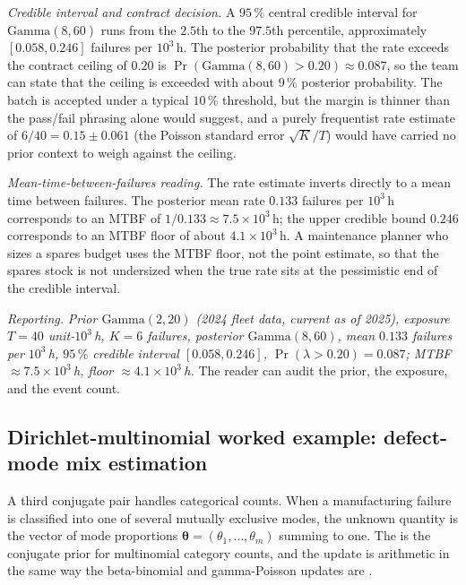 

\textit{Credible interval and contract decision.} A $95 \,\%$
central credible interval for $\text{Gamma}(8, 60)$ runs from the
$2.5$th to the $97.5$th percentile, approximately $[0.058, 0.246]$
failures per $10^{3}\,\si{\hour}$. The posterior probability that
the rate exceeds the contract ceiling of $0.20$ is
$\Pr(\text{Gamma}(8, 60) > 0.20) \approx 0.087$, so the team can
state that the ceiling is exceeded with about $9 \,\%$ posterior
probability. The batch is accepted under a typical $10 \,\%$
threshold, but the margin is thinner than the pass/fail phrasing
alone would suggest, and a purely frequentist rate estimate of
$6/40 = 0.15 \pm 0.061$ (the Poisson standard error
$\sqrt{K}/T$) would have carried no prior context to weigh against
the ceiling.

\textit{Mean-time-between-failures reading.} The rate estimate
inverts directly to a mean time between failures. The posterior
mean rate $0.133$ failures per $10^{3}\,\si{\hour}$ corresponds to
an MTBF of $1/0.133 \approx 7.5 \times 10^{3}\,\si{\hour}$; the
upper credible bound $0.246$ corresponds to an MTBF floor of
about $4.1 \times 10^{3}\,\si{\hour}$. A maintenance planner who
sizes a spares budget uses the MTBF floor, not the point estimate,
so that the spares stock is not undersized when the true rate sits
at the pessimistic end of the credible interval.

\textit{Reporting.} \emph{Prior $\text{Gamma}(2, 20)$ (2024 fleet
data, current as of 2025), exposure $T = 40$ unit-$10^{3}\,$h,
$K = 6$ failures, posterior $\text{Gamma}(8, 60)$, mean $0.133$
failures per $10^{3}\,$h, $95 \,\%$ credible interval
$[0.058, 0.246]$, $\Pr(\lambda > 0.20) = 0.087$; MTBF
$\approx 7.5 \times 10^{3}\,$h, floor $\approx 4.1 \times
10^{3}\,$h.} The reader can audit the prior, the exposure, and the
event count.

\subsection{Dirichlet-multinomial worked example: defect-mode
mix estimation}

A third conjugate pair handles categorical counts. When a
manufacturing failure is classified into one of several mutually
exclusive modes, the unknown quantity is the vector of mode
proportions $\boldsymbol\theta = (\theta_{1}, \ldots, \theta_{m})$
summing to one. The  is the
conjugate prior for multinomial category counts, and the update is
arithmetic in the same way the beta-binomial and gamma-Poisson
updates are \cite[ch.~3]{text:ch08-gelman-bda3-2013}.

